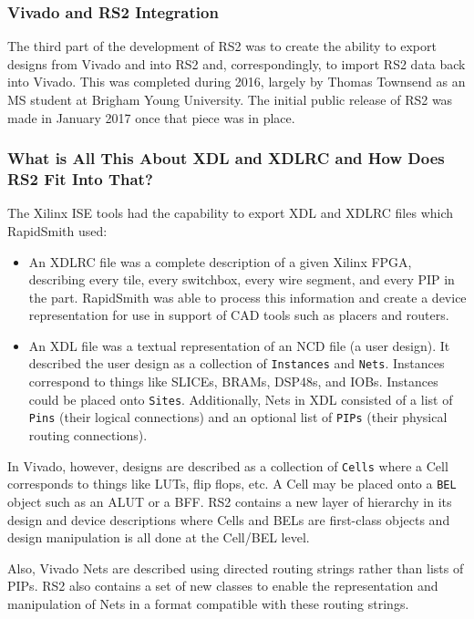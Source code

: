 \documentclass[12pt]{article}
\newcommand{\cls}[1]{{\texttt{#1}}}
\begin{document}
\subsubsection{Vivado and RS2 Integration}
The third part of the development of RS2 was to create the ability to export
designs from Vivado and into RS2 and, correspondingly, to import RS2 data back
into Vivado.  This was completed during 2016, largely by Thomas Townsend
as an MS student at Brigham Young University.  The initial
public release of RS2 was made in January 2017 once that piece was in place.

\subsubsection{What is All This About XDL and XDLRC and How Does RS2 Fit Into
That?} 
The Xilinx ISE tools had the capability to export XDL and XDLRC files which
RapidSmith used: 
\begin{itemize}
  \item An XDLRC file was a complete description of a given Xilinx FPGA,
  describing every tile, every switchbox, every wire segment, and every PIP in
  the part.  RapidSmith was able to process this information and create a device
  representation for use in support of CAD tools such as placers and routers.
  \item An XDL file was a textual representation of an NCD file (a user design).
  It described the user design as a collection of \cls{Instances} and \cls{Nets}. Instances
  correspond to things like {SLICEs}, {BRAMs}, {DSP48s}, and {IOBs}.  Instances could be
  placed onto \cls{Sites}. Additionally, Nets in XDL consisted of a list of
  \cls{Pins} (their logical connections) and an optional list of \cls{PIPs} (their physical
  routing connections).
\end{itemize}
In Vivado, however, designs are described as a collection of \cls{Cells} where a Cell
corresponds to things like LUTs, flip flops, etc.  A Cell may be placed
onto a \cls{BEL} object such as an ALUT or a BFF.  RS2 contains a new layer of
hierarchy in its design and device descriptions where Cells and BELs are first-class objects and
design manipulation is all done at the Cell/BEL level.

Also, Vivado Nets are described using directed routing strings rather than lists
of PIPs.  RS2 also contains a set of new classes to enable the representation
and manipulation of Nets in a format compatible with these routing strings.
\end{document}
